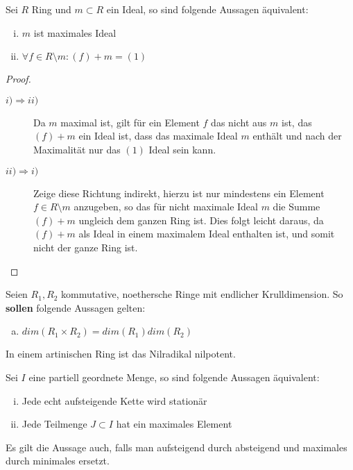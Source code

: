 \documentclass[ngerman, parskip=half, titlepage=false]{scrartcl}
\begin{document}
\begin{Beh}
  Sei $R$ Ring und $m \subset R$ ein Ideal, so sind folgende Aussagen äquivalent:\\
  \begin{enumerate}[i)]
    \item $m$ ist maximales Ideal
    \item $\forall f \in R  \setminus m : (f) + m = (1) $ 
  \end{enumerate}
  \begin{proof}
    \begin{description}
      \item[$i) \Rightarrow ii)$] Da $m$ maximal ist, gilt für ein Element $f$ das 
        nicht aus $m$ ist, das $(f) + m$ ein Ideal ist, dass das maximale Ideal
        $m$ enthält und nach der Maximalität nur das $(1)$ Ideal sein kann.
      \item[$ii) \Rightarrow i)$] Zeige diese Richtung indirekt, hierzu ist
        nur mindestens ein Element $f \in R \setminus m$ anzugeben, so das für
        nicht maximale Ideal $m$ die Summe $(f) + m $ ungleich dem ganzen Ring
        ist. Dies folgt leicht daraus, da $(f) + m$ als Ideal in einem maximalem
        Ideal enthalten ist, und somit nicht der ganze Ring ist.
    \end{description}
  \end{proof}
\end{Beh}

\begin{Beh}
  Seien $R_1,R_2$ kommutative, noethersche Ringe mit endlicher
  Krulldimension. So \textbf{sollen} folgende Aussagen
  gelten:\\
  \begin{enumerate}[a)]
    \item $dim(R_1 \times R_2) = dim(R_1) dim(R_2)$
  \end{enumerate}
\end{Beh}

\begin{Lem}
  In einem artinischen Ring ist das Nilradikal nilpotent.
\end{Lem}

\begin{Lem}
  Sei $I$ eine partiell geordnete Menge, so sind folgende Aussagen äquivalent:\\
  \begin{enumerate}[i)]
    \item Jede echt aufsteigende Kette wird stationär
    \item Jede Teilmenge $J \subset I$ hat ein maximales Element
  \end{enumerate}
  Es gilt die Aussage auch, falls man aufsteigend durch absteigend und maximales
  durch minimales ersetzt.
\end{Lem}
\end{document}
